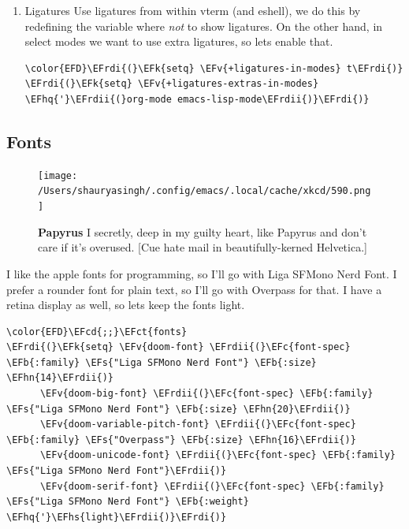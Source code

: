 \documentclass{scrartcl}
\newcommand{\EFk}[1]{\textcolor{EFk}{#1}} %
\newcommand{\EFs}[1]{\textcolor{EFs}{#1}} %
\newcommand{\EFb}[1]{\textcolor{EFb}{#1}} %
\newcommand{\EFct}[1]{\textcolor{EFct}{#1}} %
\newcommand{\EFc}[1]{\textcolor{EFc}{#1}} %
\newcommand{\EFv}[1]{\textcolor{EFv}{#1}} %
\newcommand{\EFcd}[1]{\textcolor{EFcd}{#1}} %
\newcommand{\EFhn}[1]{#1} %
\newcommand{\EFhq}[1]{#1} %
\newcommand{\EFhs}[1]{#1} %
\newcommand{\EFrdi}[1]{#1} %
\newcommand{\EFrdii}[1]{#1} %
\begin{document}
\begin{enumerate}
\item Ligatures
\label{sec:orgea584a2}
Use ligatures from within vterm (and eshell), we do this by redefining the variable where \emph{not} to show ligatures. On the other hand, in select modes we want to use extra ligatures, so lets enable that.
\begin{Code}
\begin{Verbatim}[]
\color{EFD}\EFrdi{(}\EFk{setq} \EFv{+ligatures-in-modes} t\EFrdi{)}
\EFrdi{(}\EFk{setq} \EFv{+ligatures-extras-in-modes} \EFhq{'}\EFrdii{(}org-mode emacs-lisp-mode\EFrdii{)}\EFrdi{)}
\end{Verbatim}
\end{Code}
\end{enumerate}

\subsection{Fonts}
\label{sec:org16a2bcd}
\begin{figure}[!htb]
    \centering
    \texttt{[image: /Users/shauryasingh/.config/emacs/.local/cache/xkcd/590.png]}
  \caption*{\label{xkcd:590} \textbf{Papyrus} I secretly, deep in my guilty heart, like Papyrus and don't care if it's overused. [Cue hate mail in beautifully-kerned Helvetica.]}
  \end{figure}

I like the apple fonts for programming, so I'll go with Liga SFMono Nerd Font. I
prefer a rounder font for plain text, so I'll go with Overpass for that. I have a retina display as well, so lets keep the fonts light.
\begin{Code}
\begin{Verbatim}[]
\color{EFD}\EFcd{;;}\EFct{fonts}
\EFrdi{(}\EFk{setq} \EFv{doom-font} \EFrdii{(}\EFc{font-spec} \EFb{:family} \EFs{"Liga SFMono Nerd Font"} \EFb{:size} \EFhn{14}\EFrdii{)}
      \EFv{doom-big-font} \EFrdii{(}\EFc{font-spec} \EFb{:family} \EFs{"Liga SFMono Nerd Font"} \EFb{:size} \EFhn{20}\EFrdii{)}
      \EFv{doom-variable-pitch-font} \EFrdii{(}\EFc{font-spec} \EFb{:family} \EFs{"Overpass"} \EFb{:size} \EFhn{16}\EFrdii{)}
      \EFv{doom-unicode-font} \EFrdii{(}\EFc{font-spec} \EFb{:family} \EFs{"Liga SFMono Nerd Font"}\EFrdii{)}
      \EFv{doom-serif-font} \EFrdii{(}\EFc{font-spec} \EFb{:family} \EFs{"Liga SFMono Nerd Font"} \EFb{:weight} \EFhq{'}\EFhs{light}\EFrdii{)}\EFrdi{)}
\end{Verbatim}
\end{Code}
\end{document}
